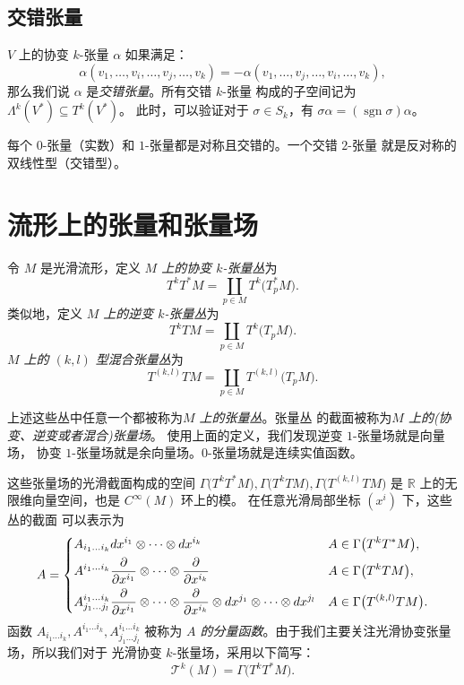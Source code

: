 \documentclass[fontset=none]{Notes}
\DeclareMathOperator\sgn{sgn}
\begin{document}
\subsection{交错张量}

$V$ 上的协变 $k$-张量 $\alpha$ 如果满足：
\[
  \alpha(v_1,\dots,v_i,\dots,v_j,\dots,v_k)=
  -\alpha(v_1,\dots,v_j,\dots,v_i,\dots,v_k),
\]
那么我们说 $\alpha$ 是\emph{交错张量}。所有交错 $k$-张量
构成的子空间记为 $\Lambda^k(V^*)\subseteq T^k(V^*)$。
此时，可以验证对于 $\sigma\in S_k$，有 $\sigma\alpha=(\sgn\sigma)\alpha$。

每个 $0$-张量（实数）和 $1$-张量都是对称且交错的。一个交错 $2$-张量
就是反对称的双线性型（交错型）。


\section{流形上的张量和张量场}

令 $M$ 是光滑流形，定义 \emph{$M$ 上的协变 $k$-张量丛}为
\[
  T^kT^*M=\coprod_{p\in M}T^k\bigl(T_p^*M\bigr).  
\] 
类似地，定义 \emph{$M$ 上的逆变 $k$-张量丛}为
\[
  T^kTM=\coprod_{p\in M}T^k\bigl(T_pM\bigr)  .
\]
\emph{$M$ 上的 $(k,l)$ 型混合张量丛}为
\[
  T^{(k,l)}TM=\coprod_{p\in M}  T^{(k,l)}\bigl(T_pM\bigr).
\]

上述这些丛中任意一个都被称为\emph{$M$ 上的张量丛}。张量丛
的截面被称为\emph{$M$ 上的(协变、逆变或者混合)张量场}。
使用上面的定义，我们发现逆变 $1$-张量场就是向量场，
协变 $1$-张量场就是余向量场。$0$-张量场就是连续实值函数。

这些张量场的光滑截面构成的空间 
$\Gamma\bigl(T^kT^*M\bigr),\Gamma\bigl(T^kTM\bigr),\Gamma\bigl(T^{(k,l)}TM\bigr)$
是 $\mathbb{R}$ 上的无限维向量空间，也是 $C^\infty(M)$ 环上的模。
在任意光滑局部坐标 $\left(x^i\right)$ 下，这些丛的截面
可以表示为
\[
  A=\begin{dcases}
    A_{i_1\dots i_k}dx^{i_1}\otimes\cdots\otimes dx^{i_k} & A\in \Gamma\bigl(T^kT^*M\bigr),\\
    A^{i_1\dots i_k}\frac{\partial}{\partial x^{i_1}}\otimes
    \cdots\otimes \frac{\partial}{\partial x^{i_k}} & A\in \Gamma\bigl(T^kTM\bigr),\\
    A_{j_1\dots j_l}^{i_1\dots i_k}\frac{\partial}{\partial x^{i_1}}\otimes
    \cdots\otimes \frac{\partial}{\partial x^{i_k}}\otimes
    dx^{j_1}\otimes\cdots\otimes dx^{j_l} & A\in \Gamma\bigl(T^{(k,l)}TM\bigr).
  \end{dcases}  
\]
函数 $A_{i_1\dots i_k},A^{i_1\dots i_k},A_{j_1\dots j_l}^{i_1\dots i_k}$ 被称为
\emph{$A$ 的分量函数}。由于我们主要关注光滑协变张量场，所以我们对于
光滑协变 $k$-张量场，采用以下简写：
\[
  \mathcal{T}^k(M)=\Gamma\bigl(T^kT^*M\bigr)  .
\]
\end{document}
